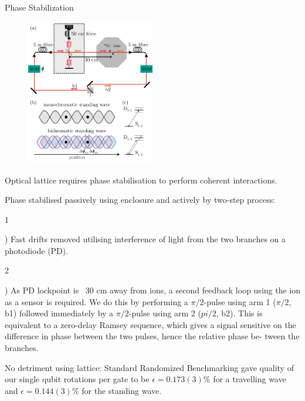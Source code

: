 \documentclass[final]{beamer}
\newcommand{\SubItem}[1]{
    {\setlength\itemindent{15pt} \item[] #1}
}
\begin{document}
\begin{frame}{}
\begin{center}
\begin{columns}[t]
\begin{column}{0.49\textwidth}
\begin{alertblock}{Phase Stabilization}
      \begin{figure}
        \includegraphics[width=0.5\textwidth]{./figs/setup+beams_horizontal.pdf}
      \end{figure}

      \begin{itemize}
      \item Optical lattice requires phase stabilisation to perform
            coherent interactions.\\
      \item Phase stabilised passively using enclosure and actively by two-step process:\\
      \SubItem 1) Fast drifts removed utilising interference of light
            from the two branches on a photodiode (PD).\\

      \SubItem 2) As PD lockpoint is ~30 cm away
            from ions, a second feedback loop using the ion as a
            sensor is required. We do this by performing a $\pi/2$-pulse
            using arm 1 ($\pi/2$, b1) followed immediately by a $\pi/2$-pulse
            using arm 2 ($pi/2$, b2). This is equivalent to a zero-delay
            Ramsey sequence, which gives a signal sensitive on the
            difference in phase between the two pulses, hence the
            relative phase be- tween the branches.\\

      \item No detriment using lattice: Standard Randomized
            Benchmarking gave quality of our single qubit rotations per
            gate to be $\epsilon = 0.173(3)\%$ for a travelling wave and
            $\epsilon = 0.144(3)\%$ for the standing wave.\\
      \end{itemize}
    \end{alertblock}



\end{column}
\end{columns}
\end{center}
\end{frame}
\end{document}
